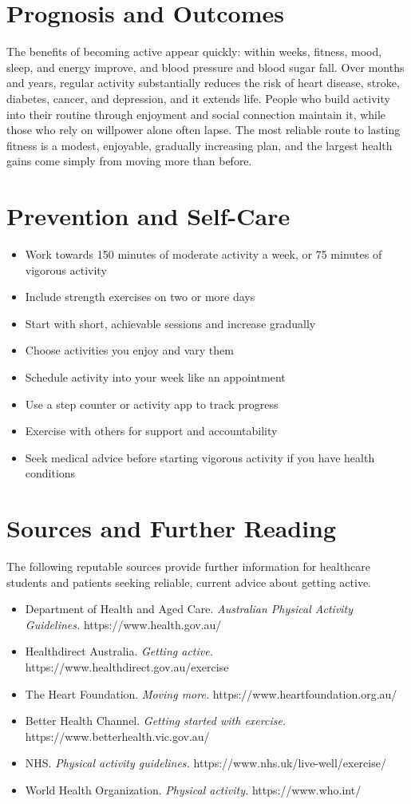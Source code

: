 \section*{Prognosis and Outcomes}
The benefits of becoming active appear quickly: within weeks, fitness, mood, sleep, and energy improve, and blood pressure and blood sugar fall. Over months and years, regular activity substantially reduces the risk of heart disease, stroke, diabetes, cancer, and depression, and it extends life. People who build activity into their routine through enjoyment and social connection maintain it, while those who rely on willpower alone often lapse. The most reliable route to lasting fitness is a modest, enjoyable, gradually increasing plan, and the largest health gains come simply from moving more than before.

\section*{Prevention and Self-Care}
\begin{itemize}
    \item Work towards 150 minutes of moderate activity a week, or 75 minutes of vigorous activity
    \item Include strength exercises on two or more days
    \item Start with short, achievable sessions and increase gradually
    \item Choose activities you enjoy and vary them
    \item Schedule activity into your week like an appointment
    \item Use a step counter or activity app to track progress
    \item Exercise with others for support and accountability
    \item Seek medical advice before starting vigorous activity if you have health conditions
\end{itemize}

\section*{Sources and Further Reading}
The following reputable sources provide further information for healthcare students and patients seeking reliable, current advice about getting active.
\begin{itemize}
    \item Department of Health and Aged Care. \textit{Australian Physical Activity Guidelines.} https://www.health.gov.au/
    \item Healthdirect Australia. \textit{Getting active.} https://www.healthdirect.gov.au/exercise
    \item The Heart Foundation. \textit{Moving more.} https://www.heartfoundation.org.au/
    \item Better Health Channel. \textit{Getting started with exercise.} https://www.betterhealth.vic.gov.au/
    \item NHS. \textit{Physical activity guidelines.} https://www.nhs.uk/live-well/exercise/
    \item World Health Organization. \textit{Physical activity.} https://www.who.int/
\end{itemize}
